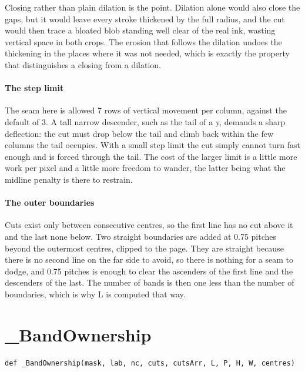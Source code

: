 Closing rather than plain dilation is the point. Dilation alone would also close the gaps, but it would leave every stroke thickened by the full radius, and the cut would then trace a bloated blob standing well clear of the real ink, wasting vertical space in both crops. The erosion that follows the dilation undoes the thickening in the places where it was not needed, which is exactly the property that distinguishes a closing from a dilation.


\paragraph{The step limit}
The seam here is allowed 7 rows of vertical movement per column, against the default of 3. A tall narrow descender, such as the tail of a y, demands a sharp deflection: the cut must drop below the tail and climb back within the few columns the tail occupies. With a small step limit the cut simply cannot turn fast enough and is forced through the tail. The cost of the larger limit is a little more work per pixel and a little more freedom to wander, the latter being what the midline penalty is there to restrain.


\paragraph{The outer boundaries}
Cuts exist only between consecutive centres, so the first line has no cut above it and the last none below. Two straight boundaries are added at 0.75 pitches beyond the outermost centres, clipped to the page. They are straight because there is no second line on the far side to avoid, so there is nothing for a seam to dodge, and 0.75 pitches is enough to clear the ascenders of the first line and the descenders of the last. The number of bands is then one less than the number of boundaries, which is why L is computed that way.


\section{\_BandOwnership}
\begin{lstlisting}[style=sig]
def _BandOwnership(mask, lab, nc, cuts, cutsArr, L, P, H, W, centres)
\end{lstlisting}

